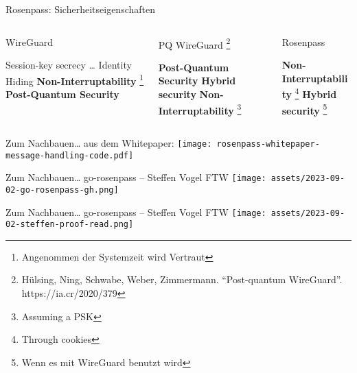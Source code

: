 \documentclass{rosenpass-beamer}
\newcommand*{\heading}[1]{%
  {%
    \hspace*{-0.5cm}#1
    \vspace{1.0em}%
  }%
}
\begin{document}
\begin{frame}{Rosenpass: Sicherheitseigenschaften}

\vspace{0.5em}
\begin{columns}[t]
\begin{column}{.30\textwidth}
\heading{WireGuard}
\begin{itemize}
  \itemtick Session-key secrecy
  \itemtick \dots
  \itemtick Identity Hiding
  \itemfail \textbf{Non-Interruptability} \footnote[frame]{Angenommen der Systemzeit wird Vertraut}
  \itemfail \textbf{Post-Quantum Security}
\end{itemize}
\end{column}

\begin{column}{.30\textwidth}
\heading{
  PQ WireGuard
  \footnote[frame]{
	  Hülsing, Ning, Schwabe, Weber, Zimmermann. “Post-quantum WireGuard”. https://ia.cr/2020/379
	}
}
\begin{itemize}
  \itemtick \textbf{Post-Quantum Security}
  \itemfail \textbf{Hybrid security}
  \itemfail \textbf{Non-Interruptability} \footnote[frame]{Assuming a PSK}
\end{itemize}
\end{column}

\begin{column}{.30\textwidth}
\heading{Rosenpass}
\begin{itemize}
  \itemtick \textbf{Non-Interruptability} \footnote[frame]{Through cookies}
  \itemtick \textbf{Hybrid security} \footnote[frame]{Wenn es mit WireGuard benutzt wird}
\end{itemize}
\end{column}

\end{columns}
\vspace{1.5em}

\end{frame}

\begin{frame}{Zum Nachbauen… aus dem Whitepaper:}
  \texttt{[image: rosenpass-whitepaper-message-handling-code.pdf]}
\end{frame}

\begin{frame}{Zum Nachbauen… go-rosenpass – Steffen Vogel FTW}
  \texttt{[image: assets/2023-09-02-go-rosenpass-gh.png]}
\end{frame}

\begin{frame}{Zum Nachbauen… go-rosenpass – Steffen Vogel FTW}
  \texttt{[image: assets/2023-09-02-steffen-proof-read.png]}
\end{frame}
\end{document}
